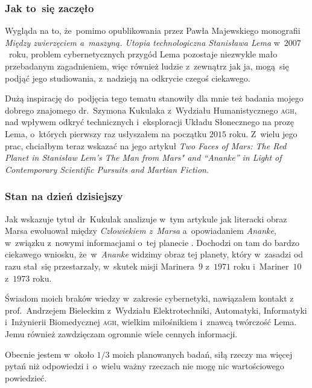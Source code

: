 \documentclass[10pt,t]{beamer}
\begin{document}
\begin{frame}
  \frametitle{Jak to~się zaczęło}


  Wygląda na to, że~pomimo opublikowania przez Pawła Majewskiego monografii
  \textit{Między zwierzęciem a~maszyną. Utopia technologiczna Stanisława
    Lema} w~$2007$~roku, problem cybernetycznych przygód Lema pozostaje
  niezwykle mało przebadanym zagadnieniem, więc również ludzie z~zewnątrz
  jak ja, mogą~się podjąć jego studiowania, z~nadzieją na odkrycie czegoś
  ciekawego.

  Dużą inspirację do~podjęcia tego tematu stanowiły dla mnie też badania
  mojego dobrego znajomego
  {dr.~Szymona Kukulaka} z~Wydziału Humanistycznego \textsc{agh}, nad
  wpływem odkryć technicznych i~eksploracji Układu Słonecznego na prozę
  Lema, o~których pierwszy raz usłyszałem na początku $2015$ roku. Z~wielu
  jego prac, chciałbym teraz wskazać na jego artykuł \textit{Two Faces of
    Mars: The Red Planet in Stanisław Lem's The Man from Mars" and
    “Ananke” in Light of Contemporary Scientific Pursuits and Martian
    Fiction}.

\end{frame}





\begin{frame}
  \frametitle{Stan na dzień dzisiejszy}


  Jak wskazuje tytuł dr~Kukulak analizuje w~tym artykule jak literacki
  obraz Marsa ewoluował między \textit{Człowiekiem z~Marsa} a~opowiadaniem
  \textit{Ananke}, w~związku z~nowymi informacjami o~tej planecie
  \parencite{Kukulak-Two-Faces-of-Mars-Pub-2023}. Dochodzi on tam do bardzo
  ciekawego wniosku, że~w~\textit{Ananke} widzimy obraz tej planety, który
  w~zasadzi od razu stał~się przestarzały, w~skutek misji Marinera~$9$
  z~$1971$ roku i~Mariner~$10$ z~$1973$ roku.

  Świadom moich braków wiedzy w~zakresie cybernetyki, nawiązałem kontakt
  z~
  {prof.~Andrzejem Bieleckim} z~Wydziału Elektrotechniki, Automatyki,
  Informatyki i~Inżynierii Biomedycznej \textsc{agh}, wielkim miłośnikiem
  i~znawcą twórczość Lema. Jemu również zawdzięczam ogromnie wiele cennych
  informacji.

  Obecnie jestem w~około $1 / 3$ moich planowanych badań, siłą rzeczy
  ma więcej pytań niż odpowiedzi i~o~wielu ważny rzeczach nie mogę nic
  wartościowego powiedzieć.

\end{frame}
\end{document}

